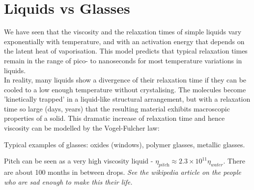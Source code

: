 \documentclass[a4paper, 11pt, normalem]{report}
\begin{document}
\section{Liquids vs Glasses}
We have seen that the viscosity and the relaxation times of simple liquids vary exponentially with temperature, and with an activation energy that depends on the latent heat of vaporisation.
This model predicts that typical relaxation times remain in the range of pico- to nanoseconds for most temperature variations in liquids. \\
In reality, many liquids show a divergence of their relaxation time if they can be cooled to a low enough temperature without crystalising.
The molecules become 'kinetically trapped' in a liquid-like structural arrangement, but with a relaxation time so large (days, years) that the resulting material exhibits macroscopic properties of a solid.
This dramatic increase of relaxation time and hence viscosity can be modelled by the Vogel-Fulcher law:
\begin{figure}[H]
    \centering
\end{figure}
Typical examples of glasses: oxides (windows), polymer glasses, metallic glasses.

Pitch can be seen as a very high viscosity liquid - $\eta_{\textit{pitch}} \approx 2.3\times10^{11}\eta_{\textit{water}}$.
There are about 100 months in between drops.
\emph{See the wikipedia article on the people who are sad enough to make this their life.}
\end{document}
